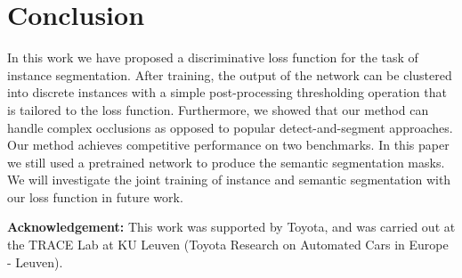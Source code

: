 \documentclass[10pt,twocolumn,letterpaper]{article}
\begin{document}
\section{Conclusion}
\label{sec:conclusion}
In this work we have proposed a discriminative loss function for the task of instance segmentation. After training, the output of the network can be clustered into discrete instances with a simple post-processing thresholding operation that is tailored to the loss function. Furthermore, we showed that our method can handle complex occlusions as opposed to popular detect-and-segment approaches. Our method achieves competitive performance on two benchmarks. 
In this paper we still used a pretrained network to produce the semantic segmentation masks. 
We will investigate the joint training of instance and semantic segmentation with our loss function in future work.

{\bf Acknowledgement:} This work was supported by Toyota, and was carried out at the TRACE Lab at KU Leuven (Toyota Research on Automated Cars in Europe - Leuven).

{\small


}
\end{document}
